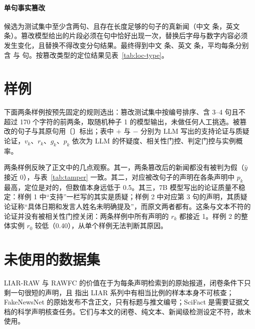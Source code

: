 \paragraph{单句事实篡改}
候选为测试集中至少含两句、且存在长度足够的句子的真新闻（中文  条，英文  条）。篡改模型给出的片段必须在句中恰好出现一次，替换后字母与数字内容必须发生变化，且替换不得改变分句结果。最终得到中文  条、英文  条，平均每条分别含  与  句。按篡改类型的定位结果见表~\ref{tab:loc-type}。

\begin{table}[H]
\centering\small
\caption{按篡改类型划分的定位 Hit@1（\%）。}\label{tab:loc-type}
\end{table}

\section{样例}\label{app:cases}

下面两条样例按预先固定的规则选出：篡改测试集中按编号排序、含 3--4 句且不超过 170 个字符的前两条，取随机种子 1 的模型输出，未做任何人工挑选。被篡改的句子与其原句用〔〕标出；表中 $+$ 与 $-$ 分别为 LLM 写出的支持论证与质疑论证，$v_k$、$r_k$、$g_k$、$p_k$ 依次为 LLM 的怀疑度、相关性门控、判定门控与实例概率。

两条样例反映了正文中的几点观察。其一，两条篡改后的新闻都没有被判为假（$\hat y$ 接近 0），与表~\ref{tab:tamper} 一致。其二，对应被改句子的声明在各条声明中 $p_k$ 最高，定位是对的，但数值本身远低于 0.5。其三，7B 模型写出的论证质量不稳定：样例 1 中“支持”一栏写的其实是质疑；样例 2 中对应第 3 句的声明，其质疑论证称“具体日期和发言人姓名未明确提及”，而原文两者都有。这条与文本不符的论证并没有被相关性门控关闭：两条样例中所有声明的 $r_k$ 都接近 1。样例 2 的整体实例 $r_0$ 较低（0.40），从单个样例无法判断其原因。



\section{未使用的数据集}

LIAR-RAW 与 RAWFC 的价值在于为每条声明检索到的原始报道，闭卷条件下只剩一句很短的声明，且 \citet{thibault2025guide} 指出 LIAR 系列中有相当比例的样本本身不可核查；FakeNewsNet 的原始发布不含正文，只有标题与推文编号；SciFact 是需要证据文档的科学声明核查任务。它们与本文的闭卷、纯文本、新闻级检测设定不符，故未使用。
